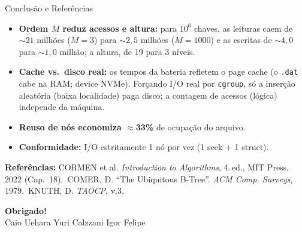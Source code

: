 \documentclass[aspectratio=169,11pt]{beamer}
\begin{document}
\begin{frame}{Conclusão e Referências}
  \begin{itemize}
    \item \textbf{Ordem $M$ reduz acessos e altura:} para $10^6$ chaves, as
      \alert{leituras} caem de ${\sim}21$ milhões ($M{=}3$) para ${\sim}2{,}5$
      milhões ($M{=}1000$) e as \alert{escritas} de ${\sim}4{,}0$ para ${\sim}1{,}0$
      milhão; a altura, de \alert{19 para 3} níveis.
    \item \textbf{Cache vs.\ disco real:} os tempos da bateria refletem o
      \alert{page cache} (o \texttt{.dat} cabe na RAM; device NVMe). Forçando I/O
      real por \texttt{cgroup}, só a inserção \alert{aleatória} (baixa localidade)
      paga disco; a \alert{contagem de acessos} (lógica) independe da máquina.
    \item \textbf{Reuso de nós economiza $\approx$33\%} de ocupação do arquivo.
    \item \textbf{Conformidade:} I/O estritamente 1 nó por vez (1 seek + 1 struct).
  \end{itemize}
  \vspace{0.2em}
  \footnotesize\textbf{Referências:} CORMEN et al. \emph{Introduction to
  Algorithms}, 4.\,ed., MIT Press, 2022 (Cap.~18). \,COMER, D. ``The Ubiquitous
  B-Tree''. \emph{ACM Comp. Surveys}, 1979. \,KNUTH, D. \emph{TAOCP}, v.3.
\end{frame}

\begin{frame}[plain]
  \centering\vspace{1.2cm}
  {\Huge\bfseries Obrigado!}\\[1.2em]
  \large Caio Uehara \quad\textbullet\quad Yuri Calzzani \quad\textbullet\quad Igor Felipe
\end{frame}
\end{document}
